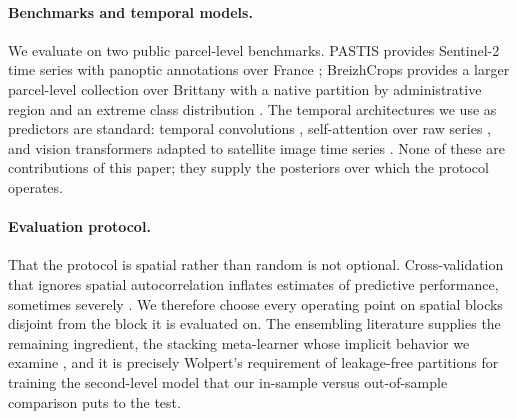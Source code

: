 \paragraph{Benchmarks and temporal models.}
We evaluate on two public parcel-level benchmarks. PASTIS provides Sentinel-2 time series with
panoptic annotations over France \cite{garnot2021pastis}; BreizhCrops provides a larger parcel-level
collection over Brittany with a native partition by administrative region and an extreme class
distribution \cite{russwurm2020breizhcrops}. The temporal architectures we use as predictors are
standard: temporal convolutions \cite{pelletier2019tempcnn}, self-attention over raw series
\cite{russwurm2020selfattention}, and vision transformers adapted to satellite image time series
\cite{tarasiou2023tsvit}. None of these are contributions of this paper; they supply the posteriors
over which the protocol operates.

\paragraph{Evaluation protocol.}
That the protocol is spatial rather than random is not optional. Cross-validation that ignores
spatial autocorrelation inflates estimates of predictive performance, sometimes severely
\cite{roberts2017crossvalidation,ploton2020spatialvalidation}. We therefore choose every operating
point on spatial blocks disjoint from the block it is evaluated on. The ensembling literature
supplies the remaining ingredient, the stacking meta-learner whose implicit behavior we examine
\cite{wolpert1992stacking,zhang2022ensemblereview,abdali2023parallelcascaded}, and it is precisely
Wolpert's requirement of leakage-free partitions for training the second-level model that our
in-sample versus out-of-sample comparison puts to the test.
